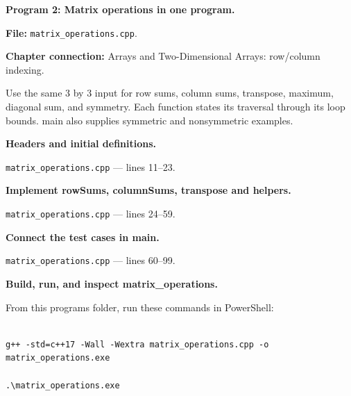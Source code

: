 \textbf{Program 2: Matrix operations in one program.}

\textbf{File:} \texttt{matrix\_operations.cpp}.

\textbf{Chapter connection:} Arrays and Two-Dimensional Arrays: row/column indexing.

Use the same 3 by 3 input for row sums, column sums, transpose, maximum, diagonal sum, and symmetry. Each function states its traversal through its loop bounds. main also supplies symmetric and nonsymmetric examples.



\begin{utpsteps}\setcounter{enumi}{0}\item \textbf{Headers and initial definitions.}\end{utpsteps}

\texttt{matrix\_operations.cpp} --- lines 11--23.




\tcbbreak

\begin{utpsteps}\setcounter{enumi}{1}\item \textbf{Implement rowSums, columnSums, transpose and helpers.}\end{utpsteps}

\texttt{matrix\_operations.cpp} --- lines 24--59.






\tcbbreak

\begin{utpsteps}\setcounter{enumi}{2}\item \textbf{Connect the test cases in main.}\end{utpsteps}

\texttt{matrix\_operations.cpp} --- lines 60--99.




\tcbbreak

\textbf{Build, run, and inspect matrix\_operations.}

From this program\textquotesingle s folder, run these commands in PowerShell:

\begin{lstlisting}[style=utpterminal,language={}]

g++ -std=c++17 -Wall -Wextra matrix_operations.cpp -o matrix_operations.exe

.\matrix_operations.exe

\end{lstlisting}

